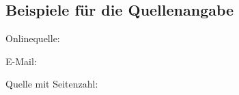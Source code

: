 \subsection{Beispiele für die Quellenangabe}


Onlinequelle: 

E-Mail: 

Quelle mit Seitenzahl: \cite[S. 2 f.]{Vaughan2016}


